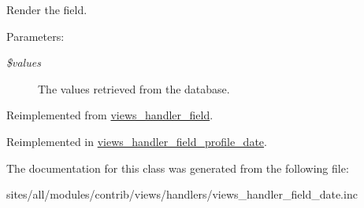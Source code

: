Render the field.

\begin{Desc}
\item[Parameters:]
\begin{description}
\item[{\em \$values}]The values retrieved from the database. \end{description}
\end{Desc}


Reimplemented from \hyperlink{classviews__handler__field_82ff951c5e9ceb97b2eab86f880cbc1e}{views\_\-handler\_\-field}.

Reimplemented in \hyperlink{classviews__handler__field__profile__date_63151e2577405b9fec938ed9ff5926d4}{views\_\-handler\_\-field\_\-profile\_\-date}.

The documentation for this class was generated from the following file:\begin{CompactItemize}
\item 
sites/all/modules/contrib/views/handlers/views\_\-handler\_\-field\_\-date.inc\end{CompactItemize}
